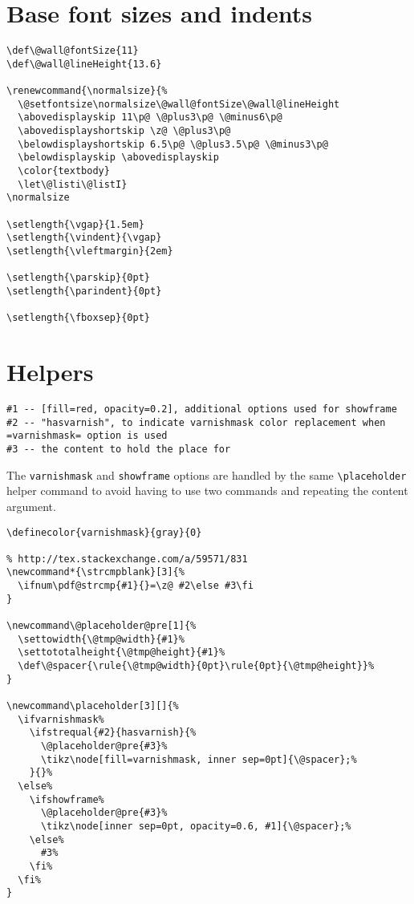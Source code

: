 \documentclass[11pt,oneside]{memoir-article}
\begin{document}
\section{Base font sizes and indents}
\label{sec:org215fe38}

\begin{verbatim}
\def\@wall@fontSize{11}
\def\@wall@lineHeight{13.6}

\renewcommand{\normalsize}{%
  \@setfontsize\normalsize\@wall@fontSize\@wall@lineHeight
  \abovedisplayskip 11\p@ \@plus3\p@ \@minus6\p@
  \abovedisplayshortskip \z@ \@plus3\p@
  \belowdisplayshortskip 6.5\p@ \@plus3.5\p@ \@minus3\p@
  \belowdisplayskip \abovedisplayskip
  \color{textbody}
  \let\@listi\@listI}
\normalsize

\setlength{\vgap}{1.5em}
\setlength{\vindent}{\vgap}
\setlength{\vleftmargin}{2em}

\setlength{\parskip}{0pt}
\setlength{\parindent}{0pt}

\setlength{\fboxsep}{0pt}
\end{verbatim}

\section{Helpers}
\label{sec:org4c3f5ae}

\begin{verbatim}
#1 -- [fill=red, opacity=0.2], additional options used for showframe
#2 -- "hasvarnish", to indicate varnishmask color replacement when =varnishmask= option is used
#3 -- the content to hold the place for
\end{verbatim}

The \texttt{varnishmask} and \texttt{showframe} options are handled by the same \texttt{\textbackslash{}placeholder}
helper command to avoid having to use two commands and repeating the content
argument.

\begin{verbatim}
\definecolor{varnishmask}{gray}{0}

% http://tex.stackexchange.com/a/59571/831
\newcommand*{\strcmpblank}[3]{%
  \ifnum\pdf@strcmp{#1}{}=\z@ #2\else #3\fi
}

\newcommand\@placeholder@pre[1]{%
  \settowidth{\@tmp@width}{#1}%
  \settototalheight{\@tmp@height}{#1}%
  \def\@spacer{\rule{\@tmp@width}{0pt}\rule{0pt}{\@tmp@height}}%
}

\newcommand\placeholder[3][]{%
  \ifvarnishmask%
    \ifstrequal{#2}{hasvarnish}{%
      \@placeholder@pre{#3}%
      \tikz\node[fill=varnishmask, inner sep=0pt]{\@spacer};%
    }{}%
  \else%
    \ifshowframe%
      \@placeholder@pre{#3}%
      \tikz\node[inner sep=0pt, opacity=0.6, #1]{\@spacer};%
    \else%
      #3%
    \fi%
  \fi%
}
\end{verbatim}
\end{document}
